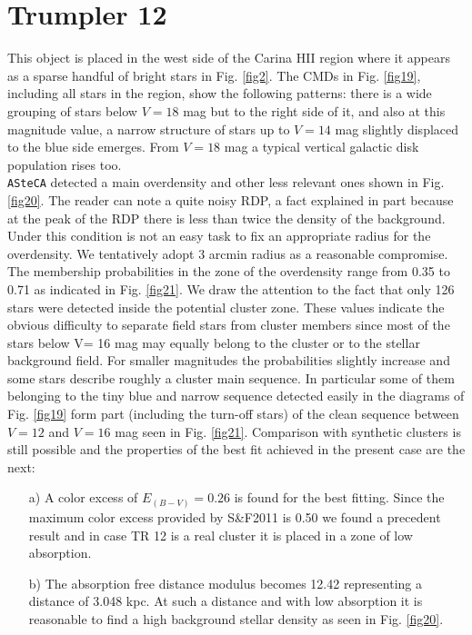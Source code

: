\documentclass{aa}
\begin{document}
\section{Trumpler 12}

This object is placed in the west side of the Carina HII region where it appears
as a sparse handful of bright stars in Fig. \ref{fig2}. The CMDs in Fig.
\ref{fig19}, including all stars in the region, show the following patterns:
there is a wide grouping of stars below $V = 18$ mag but to the right side of
it, and also at this magnitude value, a narrow structure of stars up to $V= 14$
mag slightly displaced to the blue side emerges. From $V = 18$ mag a typical
vertical galactic disk population rises too.\\

\texttt{ASteCA} detected a main overdensity and other less relevant ones shown
in Fig. \ref{fig20}. The reader can note a quite noisy RDP, a fact explained in
part because at the peak of the RDP there is less than twice the density of the
background. Under this condition is not an easy task to fix an appropriate
radius for the overdensity. We tentatively adopt 3 arcmin radius as a reasonable
compromise. The membership probabilities in the zone of the overdensity range
from 0.35 to 0.71 as indicated in Fig. \ref{fig21}. We draw the attention to the
fact that only 126 stars were detected inside the potential cluster zone. These
values indicate the obvious difficulty to separate field stars from cluster
members since most of the stars below V= 16 mag may equally belong to the
cluster or to the stellar background field. For smaller magnitudes the
probabilities slightly increase and some stars describe roughly a cluster main
sequence. In particular some of them belonging to the tiny blue and narrow
sequence detected easily in the diagrams of Fig. \ref{fig19} form part
(including the turn-off stars) of the clean sequence between $V = 12$ and $V =
16$ mag seen in Fig. \ref{fig21}. Comparison with synthetic clusters is still
possible and the properties of the best fit achieved in the present case are the
next:

\begin{itemize}
\item [a)] A color excess of $E_{(B-V)} = 0.26$ is found for the best fitting.
    Since the maximum color excess provided by S\&F2011 is 0.50 we found a
    precedent result and in case TR 12 is a real cluster it is placed in a
    zone of low absorption.
\item [b)] The absorption free distance modulus becomes 12.42 representing a
    distance of 3.048 kpc. At such a distance and with low absorption it is
    reasonable to find a high background stellar density as seen in Fig. 
    \ref{fig20}.
\end{itemize}
\end{document}
